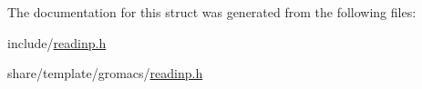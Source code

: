 \-The documentation for this struct was generated from the following files\-:\begin{DoxyCompactItemize}
\item 
include/\hyperlink{include_2readinp_8h}{readinp.\-h}\item 
share/template/gromacs/\hyperlink{share_2template_2gromacs_2readinp_8h}{readinp.\-h}\end{DoxyCompactItemize}
